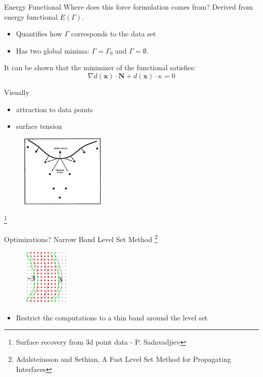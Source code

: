 \documentclass{beamer}
\begin{document}
\begin{frame}{Energy Functional}
Where does this force formulation comes from? Derived from energy functional $E(\Gamma)$.
\begin{itemize}
\item Quantifies how $\Gamma$ corresponds to the data set
\item Has two global minima: $\Gamma = \Gamma_0$  and $\Gamma = \emptyset$.
\end{itemize}
It can be shown that the minimizer of the functional satisfies:
\[
\nabla d(\mathbf{x}) \cdot \mathbf{N} + d(\mathbf{x}) \cdot \kappa = 0
\]
\end{frame}
\begin{frame}{Visually}
\begin{itemize}
\item attraction to data points
\item surface tension
\end{itemize}
\begin{figure}[H]
\centering
\includegraphics[width=40mm]{img/savadjiev3_3.png}
\end{figure}\footnote{Surface recovery from 3d point data - P. Sadavadjiev}
\end{frame}


\begin{frame}{Optimizations?}
  Narrow Band Level Set Method \footnote{Adalsteinsson and Sethian, A Fast Level Set Method for Propagating Interfaces}
  \begin{figure}[H]
  \centering
  \includegraphics[width=0.2\textwidth]{img/narrow_band.png}
  \end{figure}
  \begin{itemize}
  \item Restrict the computations to a thin band around the level set
  \end{itemize}
\end{frame}
\end{document}
